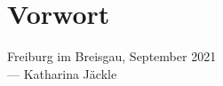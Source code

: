 \section{Vorwort}




\vspace{0.5cm}

\begin{flushright}
	{
		\small
		Freiburg im Breisgau, September 2021\\
		--- Katharina Jäckle
	}
\end{flushright}
